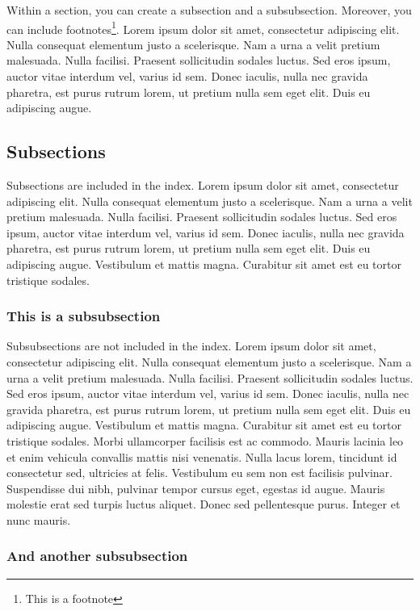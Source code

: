 Within a section, you can create a subsection and a subsubsection. Moreover, you can include footnotes\footnote{This is a footnote}. Lorem ipsum dolor sit amet, consectetur adipiscing elit. Nulla consequat elementum justo a scelerisque. Nam a urna a velit pretium malesuada. Nulla facilisi. Praesent sollicitudin sodales luctus. Sed eros ipsum, auctor vitae interdum vel, varius id sem. Donec iaculis, nulla nec gravida pharetra, est purus rutrum lorem, ut pretium nulla sem eget elit. Duis eu adipiscing augue.

\subsection{Subsections}

Subsections are included in the index. Lorem ipsum dolor sit amet, consectetur adipiscing elit. Nulla consequat elementum justo a scelerisque. Nam a urna a velit pretium malesuada. Nulla facilisi. Praesent sollicitudin sodales luctus. Sed eros ipsum, auctor vitae interdum vel, varius id sem. Donec iaculis, nulla nec gravida pharetra, est purus rutrum lorem, ut pretium nulla sem eget elit. Duis eu adipiscing augue. Vestibulum et mattis magna. Curabitur sit amet est eu tortor tristique sodales.

\subsubsection{This is a subsubsection}

Subsubsections are not included in the index. Lorem ipsum dolor sit amet, consectetur adipiscing elit. Nulla consequat elementum justo a scelerisque. Nam a urna a velit pretium malesuada. Nulla facilisi. Praesent sollicitudin sodales luctus. Sed eros ipsum, auctor vitae interdum vel, varius id sem. Donec iaculis, nulla nec gravida pharetra, est purus rutrum lorem, ut pretium nulla sem eget elit. Duis eu adipiscing augue. Vestibulum et mattis magna. Curabitur sit amet est eu tortor tristique sodales. Morbi ullamcorper facilisis est ac commodo. Mauris lacinia leo et enim vehicula convallis mattis nisi venenatis. Nulla lacus lorem, tincidunt id consectetur sed, ultricies at felis. Vestibulum eu sem non est facilisis pulvinar. Suspendisse dui nibh, pulvinar tempor cursus eget, egestas id augue. Mauris molestie erat sed turpis luctus aliquet. Donec sed pellentesque purus. Integer et nunc mauris.

\subsubsection{And another subsubsection}

